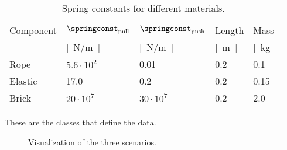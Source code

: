 \begin{table}
    \centering
    \footnotesize
    \begin{tabular}{lllll}
        Component & $\springconst_\mathrm{pull}$ & $\springconst_\mathrm{push}$ & Length       & Mass \\
                  & \unit[]{[N/m]}               & \unit[]{[N/m]}               & \unit[]{[m]} & \unit[]{[kg]} \\
        \toprule
        Rope      & $5.6\cdot 10^2$              & 0.01                         & 0.2          & 0.1 \\
        Elastic   & 17.0                         & 0.2                          & 0.2          & 0.15 \\
        Brick     & $20\cdot 10^7$               & $30\cdot 10^7$               & 0.2          & 2.0 \\
    \end{tabular}
    \caption{Spring constants for different materials.
    }
    \label{tab:spring_const}
\end{table}

These are the classes that define the data.


\begin{figure}
    \hfill
    \hfill
    \hfill
    \hfill
    \caption{Visualization of the three scenarios.
    }
\end{figure}



\clearpage
